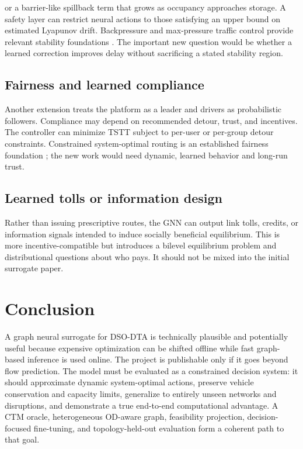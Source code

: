 \documentclass[11pt]{article}
\begin{document}
or a barrier-like spillback term that grows as occupancy approaches storage.  A safety
layer can restrict neural actions to those satisfying an upper bound on estimated
Lyapunov drift.  Backpressure and max-pressure traffic control provide relevant
stability foundations \citep{varaiya2013,gregoire2014,zaidi2016}.  The important new
question would be whether a learned correction improves delay without sacrificing a
stated stability region.

\subsection{Fairness and learned compliance}

Another extension treats the platform as a leader and drivers as probabilistic
followers.  Compliance may depend on recommended detour, trust, and incentives.  The
controller can minimize TSTT subject to per-user or per-group detour constraints.
Constrained system-optimal routing is an established fairness foundation
\citep{jahn2005}; the new work would need dynamic, learned behavior and long-run trust.

\subsection{Learned tolls or information design}

Rather than issuing prescriptive routes, the GNN can output link tolls, credits, or
information signals intended to induce socially beneficial equilibrium.  This is more
incentive-compatible but introduces a bilevel equilibrium problem and distributional
questions about who pays.  It should not be mixed into the initial surrogate paper.

\section{Conclusion}

A graph neural surrogate for DSO-DTA is technically plausible and potentially useful
because expensive optimization can be shifted offline while fast graph-based inference
is used online.  The project is publishable only if it goes beyond flow prediction.
The model must be evaluated as a constrained decision system: it should approximate
dynamic system-optimal actions, preserve vehicle conservation and capacity limits,
generalize to entirely unseen networks and disruptions, and demonstrate a true
end-to-end computational advantage.  A CTM oracle, heterogeneous OD-aware graph,
feasibility projection, decision-focused fine-tuning, and topology-held-out evaluation
form a coherent path to that goal.



\end{document}
